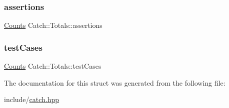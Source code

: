 \subsubsection{\texorpdfstring{assertions}{assertions}}
{\footnotesize\ttfamily \mbox{\hyperlink{structCatch_1_1Counts}{Counts}} Catch\+::\+Totals\+::assertions}

\mbox{\label{structCatch_1_1Totals_adb195fe477aedee2ecea88c888f16506}} 
\subsubsection{\texorpdfstring{test\+Cases}{testCases}}
{\footnotesize\ttfamily \mbox{\hyperlink{structCatch_1_1Counts}{Counts}} Catch\+::\+Totals\+::test\+Cases}



The documentation for this struct was generated from the following file\+:\begin{DoxyCompactItemize}
\item 
include/\mbox{\hyperlink{catch_8hpp}{catch.\+hpp}}\end{DoxyCompactItemize}
